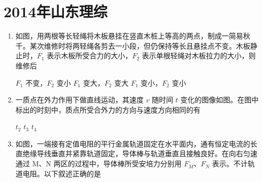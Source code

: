\documentclass[\gkver]{gaokaozhenti}
\begin{document}
\chapter{2014年山东理综}

\begin{enumerate}
\item
如图，用两根等长轻绳将木板悬挂在竖直木桩上等高的两点，制成一简易秋千。某次维修时将两轻绳各剪去一小段，但仍保持等长且悬挂点不变。木板静止时，$F_{1}$ 表示木板所受合力的大小，$F_{2}$ 表示单根轻绳对木板拉力的大小，则维修后


{$F_{1}$ 不变，$F_{2}$ 变小}
{$F_{1}$ 变大，$F_{2}$ 变大}
{$F_{1}$ 变小，$F_{2}$ 变小}


\item
一质点在外力作用下做直线运动，其速度 $v$ 随时间 $t$ 变化的图像如图。在图中标出的时刻中，质点所受合外力的方向与速度方向相同的有


{$t_{2}$}
{$t_{3}$}
{$t_{4}$}


\item
如图，一端接有定值电阻的平行金属轨道固定在水平面内，通有恒定电流的长直绝缘导线垂直并紧靠轨道固定，导体棒与轨道垂直且接触良好。在向右匀速通过 M、N 两区的过程中，导体棒所受安培力分别用 $F_{M}$、$F_{N}$ 表示。不计轨道电阻。以下叙述正确的是


\end{enumerate}
\end{document}

